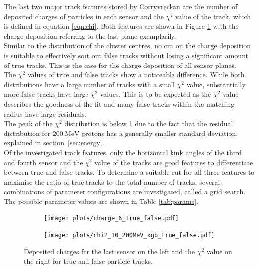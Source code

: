 The last two major track features stored by Corryvreckan are the number of deposited charges of particles in each sensor and the $\chi^2$ value of the track,
which is defined in equation \ref{eqn:chi}.
Both features are shown in Figure \ref{fig:charge_chi} with the charge deposition referring to the last plane exemplarily. \\
Similar to the distribution of the cluster centres, no cut on the charge deposition is suitable to effectively sort out false tracks without losing a significant
amount of true tracks. This is the case for the charge deposition of all sensor planes. \\
The $\chi^2$ values of true and false tracks show a noticeable difference. While both distributions have a large number of tracks
with a small $\chi^2$ value, substantially more false tracks have large $\chi^2$ values. This is to be expected as the $\chi^2$ value describes the goodness of the fit and
many false tracks within the matching radius have large residuals. \\
The peak of the $\chi^2$ distribution is below 1 due to the fact that the residual distribution
for $\SI{200}{\mega\eV}$ protons has a generally smaller standard deviation, explained in \mbox{section \ref{sec:energy}}. \\
Of the investigated track features, only the horizontal kink angles of the third and fourth sensor and the $\chi^2$ value of the tracks are good
features to differentiate between true and false tracks. To determine a suitable
cut for all three features to maximise the ratio of true tracks to the total number of tracks,
several combinations of parameter configurations are investigated, called a
grid search.
The possible parameter values are shown in Table \ref{tab:params}. \\

\begin{figure}
  \hspace{-0.4cm}
  \begin{subfigure}{0.51\textwidth}
      \centering
      \texttt{[image: plots/charge\_6\_true\_false.pdf]}
  \end{subfigure}
  \begin{subfigure}{0.51\textwidth}
      \hspace{-0.11cm}
      \texttt{[image: plots/chi2\_10\_200MeV\_xgb\_true\_false.pdf]}
  \end{subfigure}
  \caption{Deposited charges for the last sensor on the left and the $\chi^2$ value on the right for true and false particle tracks.}
  \label{fig:charge_chi}
\end{figure}


